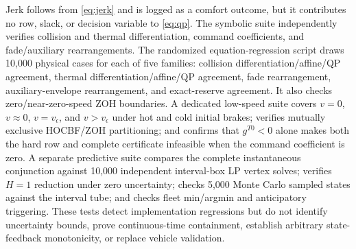 Jerk follows from \eqref{eq:jerk} and is logged as a comfort outcome, but it contributes no row, slack, or decision variable to \eqref{eq:qp}. The symbolic suite independently verifies collision and thermal differentiation, command coefficients, and fade/auxiliary rearrangements. The randomized equation-regression script draws 10,000 physical cases for each of five families: collision differentiation/affine/QP agreement, thermal differentiation/affine/QP agreement, fade rearrangement, auxiliary-envelope rearrangement, and exact-reserve agreement. It also checks zero/near-zero-speed ZOH boundaries. A dedicated low-speed suite covers $v=0$, $v\approx0$, $v=v_\epsilon$, and $v>v_\epsilon$ under hot and cold initial brakes; verifies mutually exclusive HOCBF/ZOH partitioning; and confirms that $g^{T0}<0$ alone makes both the hard row and complete certificate infeasible when the command coefficient is zero. A separate predictive suite compares the complete instantaneous conjunction against 10,000 independent interval-box LP vertex solves; verifies $H=1$ reduction under zero uncertainty; checks 5,000 Monte Carlo sampled states against the interval tube; and checks fleet min/argmin and anticipatory triggering. These tests detect implementation regressions but do not identify uncertainty bounds, prove continuous-time containment, establish arbitrary state-feedback monotonicity, or replace vehicle validation.
